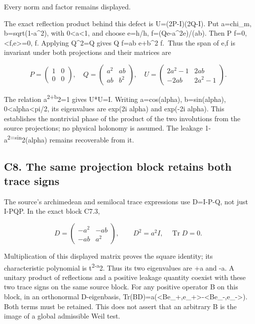 \documentclass[
]{article}
\begin{document}
Every norm and factor remains displayed.

The exact reflection product behind this defect is U=(2P-I)(2Q-I). Put
a=\textbar chi\_m\textbar, b=sqrt(1-a\^{}2), with
0\textless a\textless1, and choose
e=h/\textbar\textbar h\textbar\textbar, f=(Qe-a\^{}2e)/(ab). Then P f=0,
\textless f,e\textgreater=0, \textbar\textbar f\textbar{}.
Applying Q\^{}2=Q gives Q f=ab e+b\^{}2 f.~Thus the span of e,f is
invariant under both projections and their matrices are

\[
P=\begin{pmatrix}1&0\\0&0\end{pmatrix},\quad
Q=\begin{pmatrix}a^2&ab\\ab&b^2\end{pmatrix},\quad
U=\begin{pmatrix}2a^2-1&2ab\\-2ab&2a^2-1\end{pmatrix}.
\tag{C7.3}
\]

The relation a\textsuperscript{2+b}2=1 gives U*U=I. Writing
a=cos(alpha), b=sin(alpha), 0\textless alpha\textless pi/2, its
eigenvalues are exp(2i alpha) and exp(-2i alpha). This establishes the
nontrivial phase of the product of the two involutions from the source
projections; no physical holonomy is assumed. The leakage
1-a\textsuperscript{2=sin}2(alpha) remains recoverable from it.

\subsection{C8. The same projection block retains both trace
signs}\label{c8.-the-same-projection-block-retains-both-trace-signs}

The source's archimedean and semilocal trace expressions use D=I-P-Q,
not just I-PQP. In the exact block C7.3,

\[
D=\begin{pmatrix}-a^2&-ab\\-ab&a^2\end{pmatrix},
\qquad D^2=a^2I,\quad\operatorname{Tr}D=0.
\tag{C8.1}
\]

Multiplication of this displayed matrix proves the square identity; its
characteristic polynomial is t\textsuperscript{2-a}2. Thus its two
eigenvalues are +a and -a. A unitary product of reflections and a
positive leakage quantity coexist with these two trace signs on the same
source block. For any positive operator B on this block, in an
orthonormal D-eigenbasis,
Tr(BD)=a(\textless Be\_+,e\_+\textgreater-\textless Be\_-,e\_-\textgreater).
Both terms must be retained. This does not assert that an arbitrary B is
the image of a global admissible Weil test.
\end{document}
